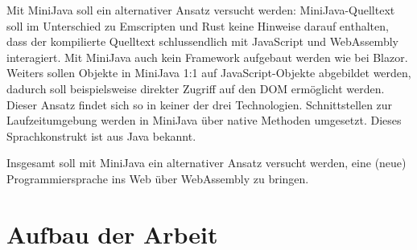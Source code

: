 Mit MiniJava soll ein alternativer Ansatz versucht werden: MiniJava-Quelltext soll im Unterschied zu Emscripten und Rust keine Hinweise darauf enthalten, dass der kompilierte Quelltext schlussendlich mit JavaScript und WebAssembly interagiert. Mit MiniJava auch kein Framework aufgebaut werden wie bei Blazor. Weiters sollen Objekte in MiniJava 1:1 auf JavaScript-Objekte abgebildet werden, dadurch soll beispielsweise direkter Zugriff auf den DOM ermöglicht werden. Dieser Ansatz findet sich so in keiner der drei Technologien. Schnittstellen zur Laufzeitumgebung werden in MiniJava über native Methoden umgesetzt. Dieses Sprachkonstrukt ist aus Java bekannt.

Insgesamt soll mit MiniJava ein alternativer Ansatz versucht werden, eine (neue) Programmiersprache ins Web über WebAssembly zu bringen.

\section{Aufbau der Arbeit}

